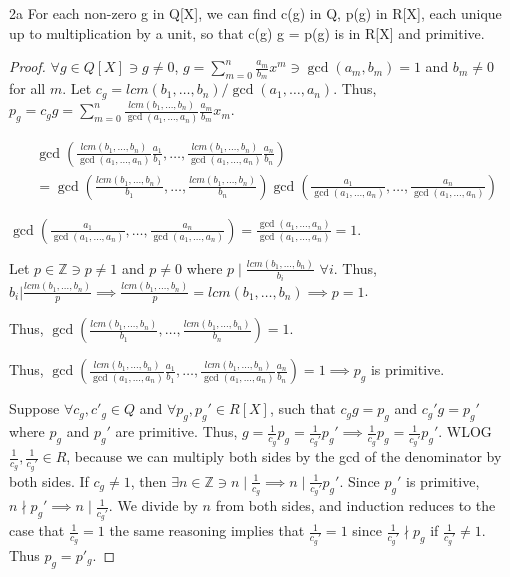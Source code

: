 \documentclass{article}
\newcommand{\Z}{\mathbb{Z}}
\begin{document}
\begin{PROB}{2a}\label{Problem 2a.}
    For each non-zero g in Q[X], we can find c(g) in Q, p(g) in R[X], each  unique up to multiplication by a unit, so that c(g) g  = p(g)  is in R[X] and primitive.
\end{PROB}
\begin{proof}
    $\forall g \in Q[X] \ni g \neq 0$, $g = \sum_{m = 0}^{n} \frac{a_m}{b_m} x^m \ni \gcd(a_m, b_m) = 1$ and $b_m \neq 0$ for all $m$. Let $c_g = lcm(b_1, \dots, b_n) / \gcd(a_1, \dots, a_n)$. Thus, $p_g = c_g g = \sum_{m = 0}^{n} \frac{lcm(b_1, \dots, b_n)}{\gcd(a_1, \dots, a_n)} \frac{a_m}{b_m} x_m$. 
    
    
    \begin{align*}
        &\gcd\left(\frac{lcm(b_1, \dots, b_n)}{\gcd(a_1, \dots, a_n)} \frac{a_1}{b_1}, \dots, \frac{lcm(b_1, \dots, b_n)}{\gcd(a_1, \dots, a_n)} \frac{a_n}{b_n}\right) \\
        &= \gcd\left(\frac{lcm(b_1, \dots, b_n)}{b_1}, \dots, \frac{lcm(b_1, \dots, b_n)}{b_n}\right) \gcd\left(\frac{a_1}{\gcd(a_1, \dots, a_n)}, \dots, \frac{a_n}{\gcd(a_1, \dots, a_n)}\right)
    \end{align*}

    $\gcd\left(\frac{a_1}{\gcd(a_1, \dots, a_n)}, \dots, \frac{a_n}{\gcd(a_1, \dots, a_n)}\right) = \frac{\gcd(a_1, \dots, a_n)}{\gcd(a_1, \dots, a_n)} = 1$. 
    
    Let $p \in \Z \ni p \neq 1$ and $p \neq 0$ where $p \mid \frac{lcm(b_1, \dots, b_n)}{b_i}$ $\forall i$. Thus, $b_i | \frac{lcm(b_1, \dots, b_n)}{p} \implies \frac{lcm(b_1, \dots, b_n)}{p} = lcm(b_1, \dots, b_n) \implies p = 1$.
    
    Thus, $\gcd\left(\frac{lcm(b_1, \dots, b_n)}{b_1}, \dots, \frac{lcm(b_1, \dots, b_n)}{b_n}\right) = 1$. 
    
    Thus, $\gcd\left(\frac{lcm(b_1, \dots, b_n)}{\gcd(a_1, \dots, a_n)} \frac{a_1}{b_1}, \dots, \frac{lcm(b_1, \dots, b_n)}{\gcd(a_1, \dots, a_n)} \frac{a_n}{b_n}\right) = 1 \implies p_g$ is primitive.


    Suppose $\forall c_g, c'_g \in Q$ and $\forall p_g, p_g' \in R[X]$, such that $c_g g = p_g$ and $c_g' g = p_g'$ where $p_g$ and $p_g'$ are primitive. Thus, $g = \frac{1}{c_g} p_g = \frac{1}{c_g'} p_g' \implies \frac{1}{c_g} p_g = \frac{1}{c_g'} p_g'$. WLOG $\frac{1}{c_g}, \frac{1}{c_g'} \in R$, because we can multiply both sides by the gcd of the denominator by both sides. If $c_g \neq 1$, then $\exists n \in \Z \ni n \mid \frac{1}{c_g} \implies n \mid \frac{1}{c_g'}p_g' $. Since $p_g'$ is primitive, $n \nmid p_g' \implies n \mid \frac{1}{c_g'}$. We divide by $n$ from both sides, and induction reduces to the case that $\frac{1}{c_g} = 1$ the same reasoning implies that $\frac{1}{c_g'} = 1$ since $\frac{1}{c_g'} \nmid p_g$ if $\frac{1}{c_g'} \neq 1$. Thus $p_g = p'_g$.
\end{proof}
\end{document}
